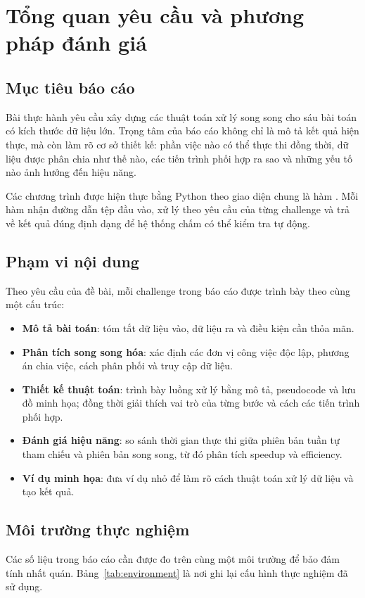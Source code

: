 \section{Tổng quan yêu cầu và phương pháp đánh giá}
\label{sec:overview}

\subsection{Mục tiêu báo cáo}
Bài thực hành yêu cầu xây dựng các thuật toán xử lý song song cho sáu bài toán có kích thước dữ liệu lớn. Trọng tâm của báo cáo không chỉ là mô tả kết quả hiện thực, mà còn làm rõ cơ sở thiết kế: phần việc nào có thể thực thi đồng thời, dữ liệu được phân chia như thế nào, các tiến trình phối hợp ra sao và những yếu tố nào ảnh hưởng đến hiệu năng.

Các chương trình được hiện thực bằng Python theo giao diện chung là hàm . Mỗi hàm nhận đường dẫn tệp đầu vào, xử lý theo yêu cầu của từng challenge và trả về kết quả đúng định dạng để hệ thống chấm có thể kiểm tra tự động.

\subsection{Phạm vi nội dung}
Theo yêu cầu của đề bài, mỗi challenge trong báo cáo được trình bày theo cùng một cấu trúc:
\begin{itemize}
  \item \textbf{Mô tả bài toán}: tóm tắt dữ liệu vào, dữ liệu ra và điều kiện cần thỏa mãn.
  \item \textbf{Phân tích song song hóa}: xác định các đơn vị công việc độc lập, phương án chia việc, cách phân phối và truy cập dữ liệu.
  \item \textbf{Thiết kế thuật toán}: trình bày luồng xử lý bằng mô tả, pseudocode và lưu đồ minh họa; đồng thời giải thích vai trò của từng bước và cách các tiến trình phối hợp.
  \item \textbf{Đánh giá hiệu năng}: so sánh thời gian thực thi giữa phiên bản tuần tự tham chiếu và phiên bản song song, từ đó phân tích speedup và efficiency.
  \item \textbf{Ví dụ minh họa}: đưa ví dụ nhỏ để làm rõ cách thuật toán xử lý dữ liệu và tạo kết quả.
\end{itemize}

\subsection{Môi trường thực nghiệm}
Các số liệu trong báo cáo cần được đo trên cùng một môi trường để bảo đảm tính nhất quán. Bảng~\ref{tab:environment} là nơi ghi lại cấu hình thực nghiệm đã sử dụng.

